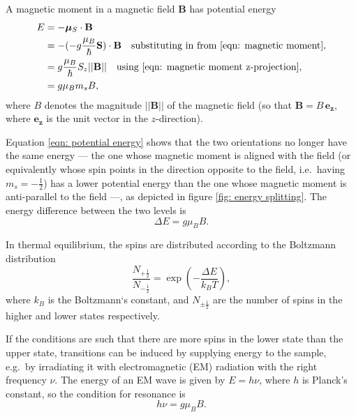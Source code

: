 \documentclass[a4paper]{jpconf}
\numberwithin{equation}{section}
\begin{document}
A magnetic moment in a magnetic field $\mathbf{B}$ has potential energy
\begin{align}
	E &= - \bm{\mu}_S \cdot \mathbf{B} \nonumber \\
	  &= - (- g \frac{\mu_B}{\hbar} \mathbf{S})\cdot\mathbf{B} \quad \text{substituting in from \eqref{eqn: magnetic moment}}, \nonumber \\
	  &= g \frac{\mu_B}{\hbar}S_z \lvert\lvert \mathbf{B} \rvert\rvert \quad \text{using \eqref{eqn: magnetic moment z-projection}}, \nonumber \\
	  &= g\mu_Bm_sB \label{eqn: potential energy},
\end{align}
where $B$ denotes the magnitude $\lvert\lvert \mathbf{B} \rvert\rvert$ of the magnetic field (so that $\mathbf{B} = B \, \mathbf{e_z}$, where $\mathbf{e_z}$ is the unit vector in the $z$-direction).

Equation \eqref{eqn: potential energy} shows that the two orientations no longer have the same energy --- the one whose magnetic moment is aligned with the field (or equivalently whose spin points in the direction opposite to the field, i.e.\ having $m_s = -\tfrac12$) has a lower potential energy than the one whose magnetic moment is anti-parallel to the field ---, as depicted in figure \ref{fig: energy splitting}. The energy difference between the two levels is 
\begin{equation}
	\Delta E = g \mu_B B. \label{eqn: energy difference}
\end{equation}

In thermal equilibrium, the spins are distributed according to the Boltzmann distribution
\[
    \frac{N_{+\tfrac12}}{N_{-\tfrac12}} = \exp(- \frac{\Delta E}{k_B T}),
\]
where $k_B$ is the Boltzmann\textquoteleft s constant, and $N_{\pm\tfrac12}$ are the number of spins in the higher and lower states respectively. 

If the conditions are such that there are more spins in the lower state than the upper state, transitions can be induced by supplying energy to the sample, e.g.\ by irradiating it with electromagnetic (EM) radiation with the right frequency $\nu$. The energy of an EM wave is given by $E = h \nu$, where $h$ is Planck's constant, so the condition for resonance is
\begin{equation}
	h\nu = g\mu_B B. \label{eqn: resonance condition}
\end{equation}
\end{document}
